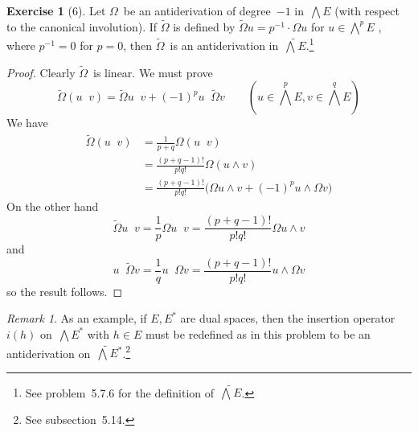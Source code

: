 \documentclass[letterpaper,12pt]{article}
\newcommand{\mult}{\cdot}
\newcommand{\eprod}{\wedge}
\newcommand{\eprodf}{\mathop{\tilde{\wedge}}}
\newcommand{\bigeprod}{\bigwedge}
\newcommand{\medeprod}{{\textstyle\bigeprod}}
\newcommand{\medeprodf}{\tilde{\medeprod}}
\theoremstyle{definition}
\newtheorem*{exer}{Exercise}
\theoremstyle{remark}
\newtheorem*{rmk}{Remark}
\begin{document}
\begin{exer}[6]
Let \(\Omega\)~be an antiderivation of degree~\(-1\) in~\(\medeprod E\) (with respect to the canonical involution). If \(\widetilde{\Omega}\) is defined by \(\widetilde{\Omega}u=p^{-1}\mult\Omega u\) for \(u\in\medeprod^p E\) , where \(p^{-1}=0\) for \(p=0\), then \(\widetilde{\Omega}\)~is an antiderivation in~\(\medeprodf E\).\footnote{See problem~5.7.6 for the definition of~\(\medeprodf E\).}
\end{exer}
\begin{proof}
Clearly \(\widetilde{\Omega}\)~is linear. We must prove
\[\widetilde{\Omega}(u\eprodf v)=\widetilde{\Omega}u\eprodf v+(-1)^pu\eprodf\widetilde{\Omega}v\qquad(u\in\medeprod^p E,v\in\medeprod^q E)\]
We have
\begin{align*}
\widetilde{\Omega}(u\eprodf v)&=\frac{1}{p+q}\Omega(u\eprodf v)\\
	&=\frac{(p+q-1)!}{p!q!}\Omega(u\eprod v)\\
	&=\frac{(p+q-1)!}{p!q!}\bigl(\Omega u\eprod v+(-1)^pu\eprod\Omega v\bigr)
\end{align*}
On the other hand
\[\widetilde{\Omega}u\eprodf v=\frac{1}{p}\Omega u\eprodf v=\frac{(p+q-1)!}{p!q!}\Omega u\eprod v\]
and
\[u\eprodf\widetilde{\Omega}v=\frac{1}{q}u\eprodf\Omega v=\frac{(p+q-1)!}{p!q!}u\eprod\Omega v\]
so the result follows.
\end{proof}
\begin{rmk}
As an example, if \(E,E^*\) are dual spaces, then the insertion operator~\(i(h)\) on~\(\medeprod E^*\) with \(h\in E\) must be redefined as in this problem to be an antiderivation on~\(\medeprodf E^*\).\footnote{See subsection~5.14.}
\end{rmk}
\end{document}
